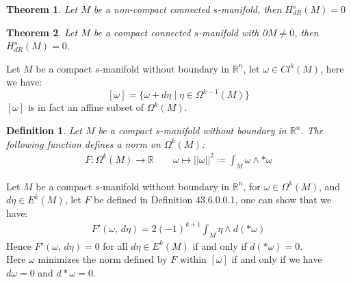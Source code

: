 \documentclass[11pt,oneside]{book}
\theoremstyle{break}
\theoremstyle{break}
\newtheorem{thm}{Theorem}[section]
\newtheorem{defn}{Definition}[corL]
\newcommand{\R}{\mathbb{R}}
\newcommand{\exercise}{\color{green}Exercise: \color{black}}
\begin{document}
\begin{thm}
Let $M$ be a non-compact connected $s$-manifold, then $H_{dR}^s(M) = 0$
\end{thm}

\begin{thm}
Let $M$ be a compact connected $s$-manifold with $\partial M\neq 0$, then $H_{dR}^s(M) = 0$.
\end{thm}


\newpage

Let $M$ be a compact $s$-manifold without boundary in $\R^n$, let $\omega \in Cl^k(M)$, here we have:
$$[\omega] = \{ \omega + d\eta \mid \eta \in \Omega^{k-1}(M)\}$$ 
$[\omega]$ is in fact an affine subset of $\Omega^k(M)$. 

\begin{defn}
Let $M$ be a compact $s$-manifold without boundary in $\R^n$. The following function defines a norm on $\Omega^k(M)$:
\begin{align*}
F: \Omega^k(M) \to \R \qquad \omega \mapsto ||\omega||^2 \coloneqq \int_M \omega \wedge * \omega 
\end{align*}
\end{defn}

Let $M$ be a compact $s$-manifold without boundary in $\R^n$, for $\omega \in \Omega^k(M)$, and $d\eta \in E^k(M)$, let $F$ be defined in Definition 43.6.0.0.1, one can show that we have:
\begin{align*}
F'(\omega,\, d\eta) = 2(-1)^{k+1} \int_M \eta \wedge d(*\omega)
\end{align*}
Hence $F'(\omega, \, d\eta) = 0$ for all $d\eta \in E^k(M)$ if and only if $d(*\omega) = 0$. \\

Here $\omega$ minimizes the norm defined by $F$ within $[\omega]$ if and only if we have $d\omega = 0$ and $d*\omega =0$. \\



\end{document}
